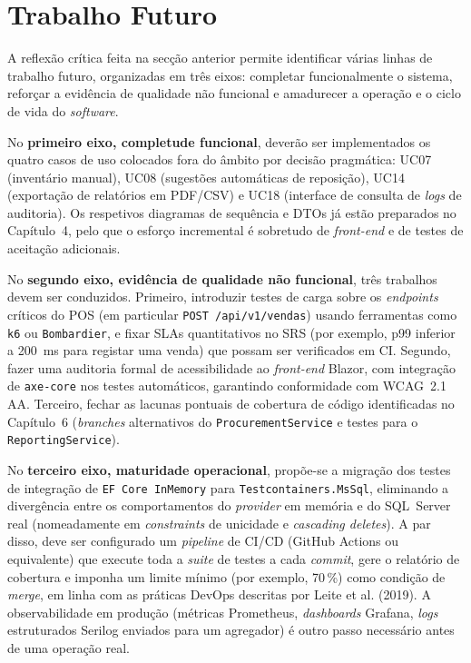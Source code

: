 \section{Trabalho Futuro}

    A reflexão crítica feita na secção anterior permite identificar várias linhas de trabalho futuro, organizadas em três eixos: completar funcionalmente o sistema, reforçar a evidência de qualidade não funcional e amadurecer a operação e o ciclo de vida do \textit{software}.

    No \textbf{primeiro eixo, completude funcional}, deverão ser implementados os quatro casos de uso colocados fora do âmbito por decisão pragmática: UC07 (inventário manual), UC08 (sugestões automáticas de reposição), UC14 (exportação de relatórios em PDF/CSV) e UC18 (interface de consulta de \textit{logs} de auditoria). Os respetivos diagramas de sequência e DTOs já estão preparados no Capítulo~4, pelo que o esforço incremental é sobretudo de \textit{front-end} e de testes de aceitação adicionais.

    No \textbf{segundo eixo, evidência de qualidade não funcional}, três trabalhos devem ser conduzidos. Primeiro, introduzir testes de carga sobre os \textit{endpoints} críticos do POS (em particular \texttt{POST /api/v1/vendas}) usando ferramentas como \texttt{k6} ou \texttt{Bombardier}, e fixar SLAs quantitativos no SRS (por exemplo, p99 inferior a 200~ms para registar uma venda) que possam ser verificados em CI. Segundo, fazer uma auditoria formal de acessibilidade ao \textit{front-end} Blazor, com integração de \texttt{axe-core} nos testes automáticos, garantindo conformidade com WCAG~2.1 AA. Terceiro, fechar as lacunas pontuais de cobertura de código identificadas no Capítulo~6 (\textit{branches} alternativos do \texttt{ProcurementService} e testes para o \texttt{ReportingService}).

    No \textbf{terceiro eixo, maturidade operacional}, propõe-se a migração dos testes de integração de \texttt{EF~Core~InMemory} para \texttt{Testcontainers.MsSql}, eliminando a divergência entre os comportamentos do \textit{provider} em memória e do SQL~Server real (nomeadamente em \textit{constraints} de unicidade e \textit{cascading deletes}). A par disso, deve ser configurado um \textit{pipeline} de CI/CD (GitHub Actions ou equivalente) que execute toda a \textit{suite} de testes a cada \textit{commit}, gere o relatório de cobertura e imponha um limite mínimo (por exemplo, 70\,\%) como condição de \textit{merge}, em linha com as práticas DevOps descritas por Leite et al. (2019). A observabilidade em produção (métricas Prometheus, \textit{dashboards} Grafana, \textit{logs} estruturados Serilog enviados para um agregador) é outro passo necessário antes de uma operação real.

